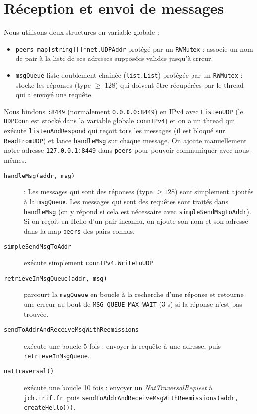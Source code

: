 \section{Réception et envoi de messages}
Nous utilisons deux structures en variable globale :
\begin{itemize}
    \item \texttt{peers map[string][]*net.UDPAddr} protégé par un \texttt{RWMutex} : associe un nom de pair à la liste de ses adresses supposées valides jusqu'à erreur.
    \item \texttt{msgQueue} liste doublement chainée (\texttt{list.List}) protégée par un \texttt{RWMutex} : stocke les réponses (type $\geqslant$ 128) qui doivent être récupérées par le thread qui a envoyé une requête.
\end{itemize}
Nous bindons \texttt{:8449} (normalement \texttt{0.0.0.0:8449}) en IPv4 avec \texttt{ListenUDP} (le \texttt{UDPConn} est stocké dans la variable globale \texttt{connIPv4}) et on a un thread qui exécute \texttt{listenAndRespond} qui reçoit tous les messages (il est bloqué sur \texttt{ReadFromUDP}) et lance \texttt{handleMsg} sur chaque message. On ajoute manuellement notre adresse \texttt{127.0.0.1:8449} dans \texttt{peers} pour pouvoir communiquer avec nous-mêmes.
\begin{description}
    \item[\texttt{handleMsg(addr, msg)}]: Les messages qui sont des réponses (type $\geqslant 128$) sont simplement ajoutés à la \texttt{msgQueue}.
        Les messages qui sont des requêtes sont traités dans \texttt{handleMsg} (on y répond si cela est nécessaire avec \texttt{simpleSendMsgToAddr}). Si on reçoit un Hello d'un pair inconnu, on ajoute son nom et son adresse dans la map \texttt{peers} des pairs connus.
    \item[\texttt{simpleSendMsgToAddr}] exécute simplement \texttt{connIPv4.WriteToUDP}.
    \item [\texttt{retrieveInMsgQueue(addr, msg)}] parcourt la \texttt{msgQueue} en boucle à la recherche d'une réponse et retourne une erreur au bout de \texttt{MSG_QUEUE_MAX_WAIT} (3 s) si la réponse n'est pas trouvée.
    \item[\texttt{sendToAddrAndReceiveMsgWithReemissions}] exécute une boucle 5 fois : envoyer la requête à une adresse, puis \texttt{retrieveInMsgQueue}.
    \item [\texttt{natTraversal()}] exécute une boucle 10 fois : envoyer un \textit{NatTraversalRequest} à \texttt{jch.irif.fr}, puis \texttt{sendToAddrAndReceiveMsgWithReemissions(addr, createHello())}.
\end{description}

